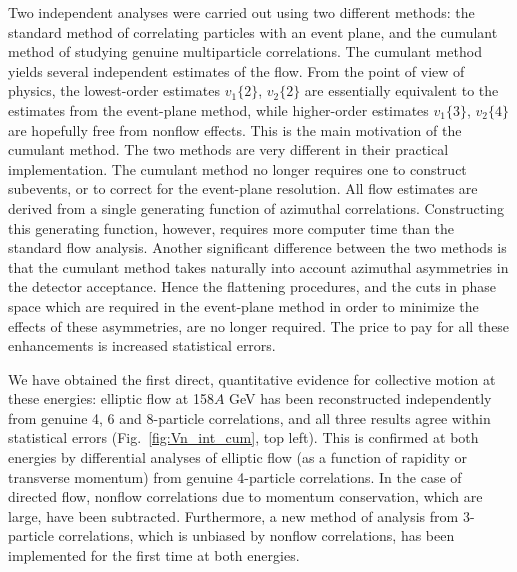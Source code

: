 \documentclass[aps,prc,superscriptaddress,showpacs,floatfix,nofootinbib]{revtex4}
\begin{document}
Two independent analyses were carried out using two different methods:
the standard method of correlating particles with an event plane, and
the cumulant method of studying genuine multiparticle
correlations. The cumulant method yields several independent estimates
of the flow. From the point of view of physics, the lowest-order
estimates $v_1\{2\}$, $v_2\{2\}$ are essentially equivalent to the
estimates from the event-plane method, while higher-order estimates
$v_1\{3\}$, $v_2\{4\}$ are hopefully free from nonflow effects. This
is the main motivation of the cumulant method. The two methods are
very different in their practical implementation. The cumulant method
no longer requires one to construct subevents, or to correct for the
event-plane resolution. All flow estimates are derived from a single
generating function of azimuthal correlations. Constructing this
generating function, however, requires more computer time than the
standard flow analysis. Another significant difference between the two
methods is that the cumulant method takes naturally into account
azimuthal asymmetries in the detector acceptance. Hence the flattening
procedures, and the cuts in phase space which are required in the
event-plane method in order to minimize the effects of these
asymmetries, are no longer required. The price to pay for all these
enhancements is increased statistical errors.

We have obtained the first direct, quantitative evidence for
collective motion at these energies: elliptic flow at 158$A$ GeV
has been reconstructed independently from genuine 4, 6 and 8-particle
correlations, and all three results agree within statistical errors
(Fig.~\ref{fig:Vn_int_cum}, top left).  This is confirmed at both
energies by differential analyses of elliptic flow (as a function of
rapidity or transverse momentum) from genuine 4-particle correlations.
In the case of directed flow, nonflow correlations due to momentum
conservation, which are large, have been subtracted.  Furthermore, a
new method of analysis from 3-particle correlations, which is unbiased
by nonflow correlations, has been implemented for the first time at
both energies.
\end{document}
